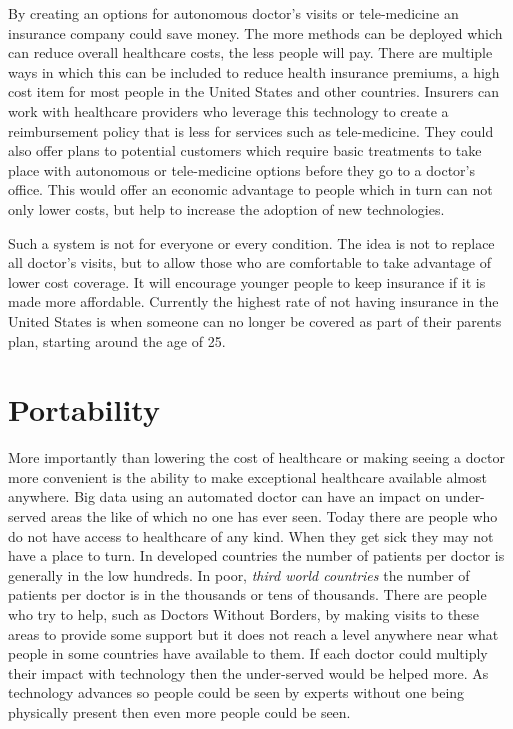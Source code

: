 \documentclass[sigconf]{acmart}
\begin{document}
By creating an options for autonomous doctor's visits or tele-medicine 
an insurance company could save money.  The more methods can be deployed 
which can reduce overall healthcare costs, the less people will pay.  
There are multiple ways in which this can be included to reduce health 
insurance premiums, a high cost item for most people in the United States 
and other countries.  Insurers can work with healthcare providers who 
leverage this technology to create a reimbursement policy that is less 
for services such as tele-medicine\cite{MedicalEconomics}.  They could 
also offer plans to potential customers which require basic treatments 
to take place with autonomous or tele-medicine options before they go 
to a doctor's office.  This would offer an economic advantage to people 
which in turn can not only lower costs, but help to increase the 
adoption of new technologies.

Such a system is not for everyone or every condition.  The idea is not 
to replace all doctor's visits, but to allow those who are comfortable 
to take advantage of lower cost coverage.  It will encourage younger 
people to keep insurance if it is made more affordable.  Currently the 
highest rate of not having insurance in the United States is when 
someone can no longer be covered as part of their parents plan, starting 
around the age of 25\cite{Census}. 

\section{Portability}
More importantly than lowering the cost of healthcare or making seeing 
a doctor more convenient is the ability to make exceptional healthcare 
available almost anywhere.  Big data using an automated doctor can have 
an impact on under-served areas the like of which no one has ever seen.  
Today there are people who do not have access to healthcare of any kind.  
When they get sick they may not have a place to turn.  In developed 
countries the number of patients per doctor is generally in the low 
hundreds.  In poor, \emph{third world countries} the number of patients 
per doctor is in the thousands or tens of thousands\cite{BigThink}.  
There are people who try to help, such as Doctors Without Borders, by 
making visits to these areas to provide some support but it does not 
reach a level anywhere near what people in some countries have available 
to them.  If each doctor could multiply their impact with technology 
then the under-served would be helped more.  As technology advances so 
people could be seen by experts without one being physically present 
then even more people could be seen.
\end{document}
